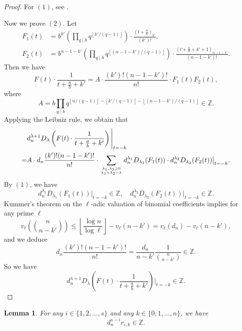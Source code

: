 \documentclass[12pt]{article}
\newtheorem{lemma}[theorem]{Lemma}
\numberwithin{equation}{section}
\begin{document}
\begin{proof}
For $(1)$, see \cite[Prop. 3.2]{LY2020}.

Now we prove $(2)$. Let 
\begin{align*}
	F_1(t) &= b^{k'}\left(\prod_{q \mid b} q^{\left\lfloor k'/(q-1) \right\rfloor}\right) \cdot \frac{\left(t+ \frac{a}{b} \right)_{k'}}{(k')!}, \\
	F_2(t) &= b^{n-1-k'}\left(\prod_{q \mid b} q^{\left\lfloor (n-1-k')/(q-1) \right\rfloor} \right)\cdot \frac{\left(t+ \frac{a}{b}+k'+1 \right)_{n-1-k'}}{(n-1-k')!}.
\end{align*}
Then we have
\[ F(t)\cdot\frac{1}{t+\frac{a}{b}+k'} = A\cdot\frac{(k')!(n-1-k')!}{n!}\cdot F_1(t)F_2(t),  \]
where
\[ A = b\prod_{q \mid b} q^{\left\lfloor n/(q-1) \right\rfloor-\left\lfloor k'/(q-1) \right\rfloor-\left\lfloor (n-1-k')/(q-1) \right\rfloor} \in \mathbb{Z}. \]
Applying the Leibniz rule, we obtain that
\begin{align*}
&d_n^{\lambda+1} D_{\lambda} \left(F(t)\cdot\frac{1}{t+\frac{a}{b}+k'}\right) \Bigg|_{t=-k} \\
=& A \cdot d_n\frac{(k')!(n-1-k')!}{n!} \cdot \sum_{\lambda_1,\lambda_2 \geqslant 0 \atop \lambda_1+\lambda_2=\lambda} d_n^{\lambda_1}D_{\lambda_1}(F_1(t))\cdot d_n^{\lambda_2}D_{\lambda_2}(F_2(t)) \big|_{t=-k}. 
\end{align*} 
By $(1)$, we have
\[ d_n^{\lambda_1}D_{\lambda_1}(F_1(t))\big|_{t=-k} \in \mathbb{Z},\quad d_n^{\lambda_2}D_{\lambda_2}(F_2(t)) \big|_{t=-k} \in \mathbb{Z}.   \]
Kummer's theorem on the $\ell$-adic valuation of binomial coefficients implies for any prime $\ell$
\[
    v_{\ell}\left( \binom{n}{n-k'}\right)\leqslant \left\lfloor \frac{\log n}{\log \ell} \right\rfloor - v_{\ell}(n-k')=v_{\ell}(d_n)-v_{\ell}(n-k'),
\]
and we deduce
\[ d_n\frac{(k')!(n-1-k')!}{n!}=\frac{d_n}{n-k'} \frac{1}{\binom{n}{n-k'}} \in \mathbb{Z}. \]
So we have 
\[ d_n^{\lambda+1} D_{\lambda} \left(F(t)\cdot\frac{1}{t+\frac{a}{b}+k'}\right) \Bigg|_{t=-k} \in \mathbb{Z}. \]
\end{proof}

\begin{lemma}\label{lemma_r_ik}
For any $i \in \{1,2,\ldots,s\}$ and any $k \in \{0,1,\ldots,n\}$, we have
\[ d_n^{s-i} r_{i,k} \in \mathbb{Z}. \]
\end{lemma}
\end{document}
